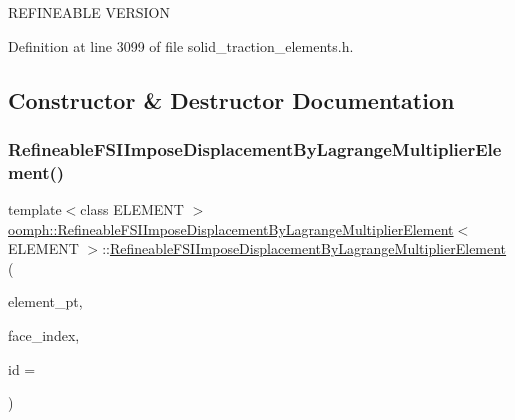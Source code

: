 R\+E\+F\+I\+N\+E\+A\+B\+LE V\+E\+R\+S\+I\+ON 

Definition at line 3099 of file solid\+\_\+traction\+\_\+elements.\+h.



\subsection{Constructor \& Destructor Documentation}
\mbox{\label{classoomph_1_1RefineableFSIImposeDisplacementByLagrangeMultiplierElement_a96dc26cea0c337b94b09a2626b3eade2}} 
\subsubsection{\texorpdfstring{Refineable\+F\+S\+I\+Impose\+Displacement\+By\+Lagrange\+Multiplier\+Element()}{RefineableFSIImposeDisplacementByLagrangeMultiplierElement()}}
{\footnotesize\ttfamily template$<$class E\+L\+E\+M\+E\+NT $>$ \\
\hyperlink{classoomph_1_1RefineableFSIImposeDisplacementByLagrangeMultiplierElement}{oomph\+::\+Refineable\+F\+S\+I\+Impose\+Displacement\+By\+Lagrange\+Multiplier\+Element}$<$ E\+L\+E\+M\+E\+NT $>$\+::\hyperlink{classoomph_1_1RefineableFSIImposeDisplacementByLagrangeMultiplierElement}{Refineable\+F\+S\+I\+Impose\+Displacement\+By\+Lagrange\+Multiplier\+Element} (\begin{DoxyParamCaption}\item[{\hyperlink{classoomph_1_1FiniteElement}{Finite\+Element} $\ast$const \&}]{element\+\_\+pt,  }\item[{const int \&}]{face\+\_\+index,  }\item[{const unsigned \&}]{id = {} }\end{DoxyParamCaption})\hspace{0.3cm}{\ttfamily [inline]}}




